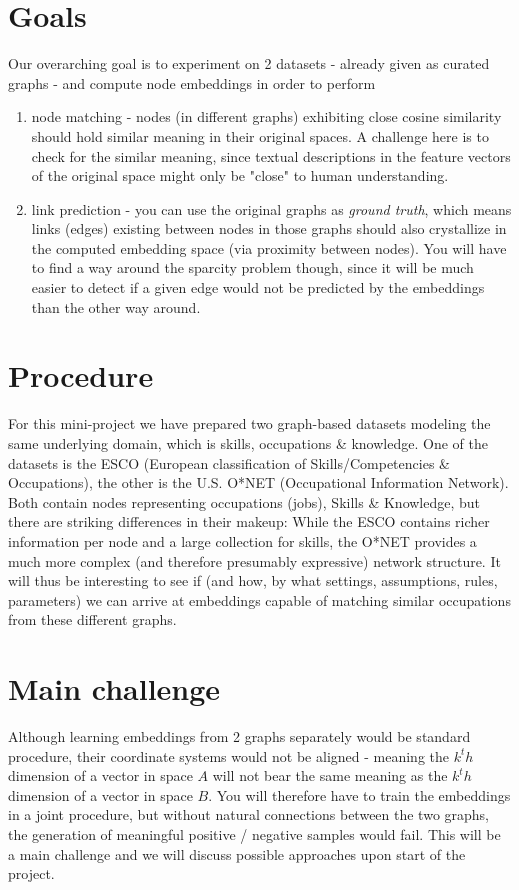 \documentclass[review]{elsarticle}
\begin{document}
\section{Goals}
\label{sect:goals}

Our overarching goal is to experiment on 2 datasets - already given as curated graphs - and compute node embeddings in order to perform 

\begin{enumerate}
  \item node matching - nodes (in different graphs) exhibiting close cosine similarity should hold similar meaning in their original spaces. A challenge here is to check for the similar meaning, since textual descriptions in the feature vectors of the original space might only be "close" to human understanding.
  \item link prediction - you can use the original graphs as \textit{ground truth}, which means links (edges) existing between nodes in those graphs should also crystallize in the computed embedding space (via proximity between nodes). You will have to find a way around the sparcity problem though, since it will be much easier to detect if a given edge would not be predicted by the embeddings than the other way around.
\end{enumerate}


\section{Procedure}
\label{sect:procedure}

For this mini-project we have prepared two graph-based datasets modeling the same underlying domain, which is skills, occupations \& knowledge. One of the datasets is the ESCO (European classification of Skills/Competencies \& Occupations), the other is the U.S. O*NET (Occupational Information Network). Both contain nodes representing occupations (jobs), Skills \& Knowledge, but there are striking differences in their makeup: While the ESCO contains richer information per node and a large collection for skills, the O*NET provides a much more complex (and therefore presumably expressive) network structure. It will thus be interesting to see if (and how, by what settings, assumptions, rules, parameters) we can arrive at embeddings capable of matching similar occupations from these different graphs.

\section{Main challenge}
\label{sect:challenge}

Although learning embeddings from 2 graphs separately would be standard procedure, their coordinate systems would not be aligned - meaning the $k^th$ dimension of a vector in space $A$ will not bear the same meaning as the $k^th$ dimension of a vector in space $B$. You will therefore have to train the embeddings in a joint procedure, but without natural connections between the two graphs, the generation of meaningful positive / negative samples would fail. This will be a main challenge and we will discuss possible approaches upon start of the project.


\end{document}
